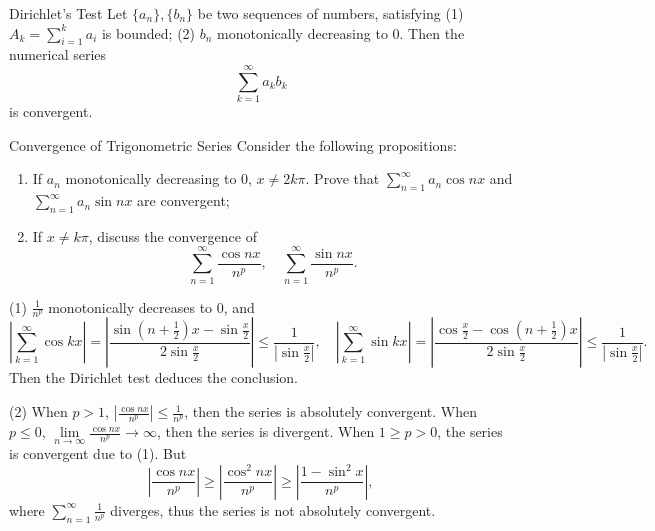 \begin{theorem}{Dirichlet's Test}{}
  Let $\{a_n\}, \{b_n\}$ be two sequences of numbers,
  satisfying
  (1) $A_k = \sum\limits_{i = 1}^k a_i$ is bounded;
  (2) $b_n$ monotonically decreasing to $0$.
  Then the numerical series
  \begin{equation}
    \sum\limits_{k = 1}^{\infty} a_kb_k
  \end{equation}
  is convergent.
\end{theorem}

\begin{example}{Convergence of Trigonometric Series}{}
  Consider the following propositions:
  \begin{enumerate}
  \item If $a_n$ monotonically decreasing to $0$, $x \neq 2k\pi$.
    Prove that $\sum\limits_{n = 1}^{\infty} a_n \cos nx$ and $\sum\limits_{n =
      1}^{\infty} a_n \sin nx$ are convergent;
  \item If $x \neq k\pi$, discuss the convergence of
    \begin{equation}
      \sum\limits_{n = 1}^{\infty} \frac{\cos nx}{n^p}, \quad
      \sum\limits_{n = 1}^{\infty} \frac{\sin nx}{n^p}.
    \end{equation}
  \end{enumerate}
\end{example}

\begin{solution}
  (1) $\frac{1}{n^p}$ monotonically decreases to $0$, and
  \begin{equation}
    \left|\sum\limits_{k = 1}^{\infty} \cos kx\right|
    = \left|\frac{\sin (n + \frac{1}{2})x - \sin \frac{x}{2}}{2 \sin \frac{x}{2}}\right|
    \leq \frac{1}{|\sin \frac{x}{2}|}, \quad
    \left|\sum\limits_{k = 1}^{\infty} \sin kx \right|
    = \left| \frac{\cos \frac{x}{2} - \cos (n + \frac{1}{2})x}{2 \sin \frac{x}{2}} \right|
    \leq \frac{1}{|\sin \frac{x}{2}|}.
  \end{equation}
  Then the Dirichlet test deduces the conclusion.

  (2) When $p > 1$, $\left| \frac{\cos nx}{n^p} \right| \leq \frac{1}{n^p}$,
  then the series is absolutely convergent.
  When $p \leq 0$, $\lim \limits _{n \rightarrow \infty} \frac{\cos nx}{n^p}
  \rightarrow \infty$, then the series is divergent.
  When $1 \geq p > 0$, the series is convergent due to (1).
  But 
  \begin{equation}
    \left| \frac{\cos nx}{n^p} \right|
    \geq \left| \frac{\cos^2 nx}{n^p} \right|
    \geq \left| \frac{1 - \sin^2 x}{n^p} \right|,
  \end{equation}
  where $\sum\limits_{n = 1}^{\infty} \frac{1}{n^p}$ diverges,
  thus the series is not absolutely convergent.
\end{solution}

